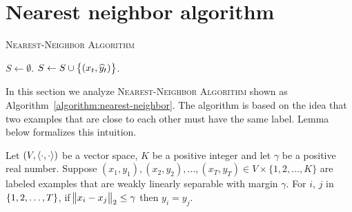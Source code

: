 \section{Nearest neighbor algorithm}
\label{section:nearest-neighbor-algorithm}

\begin{algorithm}[H]
\caption{\textsc{Nearest-Neighbor Algorithm}}
\begin{algorithmic}[1]
\STATE $S \gets \emptyset$.
\ELSE
  \label{line:nearest-neighbor-explore}
    \STATE $S \gets S \cup \cbr{(x_t, \widehat{y}_t)}$.
  \ENDIF
\ENDIF
\ENDFOR
\end{algorithmic}
\label{algorithm:nearest-neighbor}
\end{algorithm}

In this section we analyze \textsc{Nearest-Neighbor Algorithm} shown as
Algorithm~\ref{algorithm:nearest-neighbor}. The algorithm is based on the idea
that two examples that are close to each other must have the same label. Lemma
below formalizes this intuition.

\begin{lemma}
\label{lemma:nearest-neighbor}
Let $(V,\left\langle \cdot, \cdot \right\rangle)$ be a vector space, $K$ be a positive integer and let
$\gamma$ be a positive real number. Suppose $(x_1,y_1), (x_2,y_2), \dots, (x_T,
y_T) \in V \times \{1,2,\dots,K\}$ are labeled examples that are weakly linearly
separable with margin $\gamma$. For $i$, $j$ in $\cbr{1,2,\dots,T}$, if
$\norm{x_i - x_j}_2 \le \gamma$ then $y_i = y_j$.
\end{lemma}

